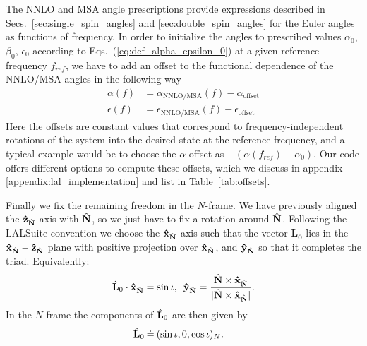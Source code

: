 \documentclass[%
aps,
prd,
amssymb,
amsmath,
amsfonts,
eqsecnum,
showpacs,
nofootinbib,
floatfix,
twocolumn,
twoside,
a4paper,
superscriptaddress
]{revtex4-1}
\newcommand{\x}{\mathbf{\hat{x}}}
\newcommand{\y}{\mathbf{\hat{y}}}
\newcommand{\z}{\mathbf{\hat{z}}}
\newcommand{\hN}{{\hat{\bf{N}}}}
\newcommand{\hLO}{{\hat{\bf{L}}}_0}
\newcommand{\LO}{\mathbf{L_0}}
\begin{document}
The NNLO and MSA angle prescriptions provide expressions described in Secs.~\ref{sec:single_spin_angles} and \ref{sec:double_spin_angles} for the Euler angles as functions of frequency. 
In order to initialize the angles to prescribed values $\alpha_0$, $\beta_0$, $\epsilon_0$
according to Eqs.~(\ref{eq:def_alpha_epsilon_0})
at a given reference frequency $f_{ref}$, we have to add an offset to the functional dependence of the NNLO/MSA angles in the following way 
\begin{subequations}
\label{eq:def_angle_offset}
\begin{align}
\alpha(f) &= \alpha_{\mathrm{NNLO/MSA}}(f) - \alpha_{\mathrm{offset}}
\\
\epsilon(f) &= \epsilon_{\mathrm{NNLO/MSA}}(f) - \epsilon_{\mathrm{offset}}
\end{align}
\end{subequations}
%
Here the offsets are constant values that
correspond to frequency-independent rotations of the system into the desired state at the reference frequency, and a typical example would be to choose the $\alpha$ offset as $-(\alpha( f_{ref}) - \alpha_0)$. 
%
Our code offers different options to compute these offsets, which we discuss in appendix \ref{appendix:lal_implementation} and list in Table~\ref{tab:offsets}.


Finally we fix the remaining freedom in the $N$-frame. We have previously aligned the $\z_{\hN}$ axis with $\hN$, so we just have to fix a rotation around $\hN$. Following the LALSuite convention \cite{laldoxygen,Schmidt:2017btt}
we choose the $\x_{\hN}$-axis such that the vector $\LO$ lies in the $\x_{\hN}-\z_{\hN}$ plane with positive projection over $\x_{\hN}$, and $\y_{\hN}$ so that it completes the triad. Equivalently:
\begin{equation}
\label{eq:axisNframe}
    \hLO \cdot \x_{\hN} = \sin \iota,  \:\;   \y_{\hN} = \frac{\hN \times \x_{\hN}}{|\hN \times \x_{\hN}|}.
\end{equation}
%
In the $N$-frame the components of $\hLO$ are then given by 
\begin{align}\label{Nframe}
    \hLO \:&\dot= \:( \sin \iota, 0, \cos \iota)_{N}.
\end{align}
\end{document}
